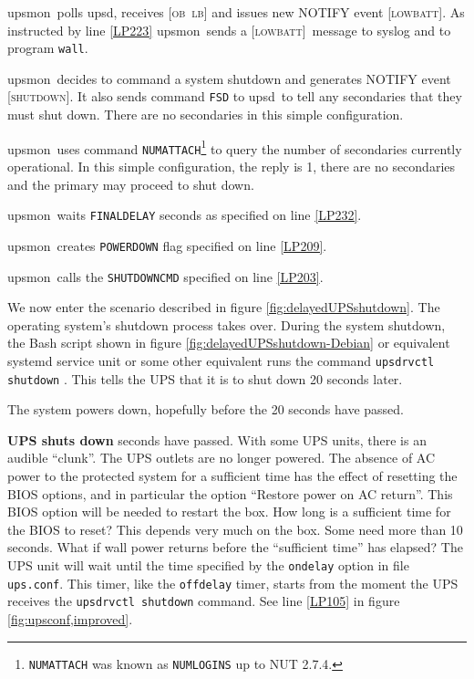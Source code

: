 \documentclass[12pt]{article}
\newcommand{\upsd}{\mbox{\textcolor{UPSDCOLOUR}{upsd}}}
\newcommand{\upsmon}{\mbox{\textcolor{MONCOLOUR}{upsmon}}}
\newcommand{\LB}{\textcolor{UPSDCOLOUR}{\textsc{lb}}}
\newcommand{\OB}{\textcolor{UPSDCOLOUR}{\textsc{ob}}}
\newcommand{\LOWBATT}{\textcolor{MONCOLOUR}{\textsc{lowbatt}}}
\newcommand{\SHUTDOWN}{\textcolor{MONCOLOUR}{\textsc{shutdown}}}
\newcommand{\status}[1]{\textcolor{UPSDCOLOUR}{[{#1}]}}
\newcommand{\NOTev}[1]{\textcolor{MONCOLOUR}{[{#1}]}}
\newcommand{\upsconf}{\textcolor{UPSDCOLOUR}{\texttt{ups.conf}}}
\newcommand{\li}{\item}                 %
\begin{document}
\li \upsmon\ polls \upsd, receives \status{\OB\ \LB} and issues new
NOTIFY event \NOTev{\LOWBATT}.  As instructed by line \ref{LP223}
\upsmon\ sends a \NOTev{\LOWBATT}\ message to syslog and to program
\texttt{wall}.

\li\label{serverLB} \upsmon\ decides to command a system shutdown and
generates NOTIFY event \NOTev{\SHUTDOWN}.  It also sends command
\texttt{FSD} to \upsd\ to tell any secondaries that they must shut down.
There are no secondaries in this simple configuration.

\li \upsmon\ uses command
\texttt{NUMATTACH}\footnote{\texttt{NUMATTACH} was known as
\texttt{NUMLOGINS} up to NUT 2.7.4.} to query the number of
secondaries currently operational.  In this simple configuration, the
reply is 1, there are no secondaries and the primary may proceed to
shut down.

\li \upsmon\ waits \texttt{FINALDELAY} seconds as specified on line \ref{LP232}.

\li \upsmon\ creates \texttt{POWERDOWN} flag specified on line \ref{LP209}.

\li \upsmon\ calls the \texttt{SHUTDOWNCMD} specified on line \ref{LP203}.

\li We now enter the scenario described in figure
\ref{fig:delayedUPSshutdown}.  The operating system's shutdown process takes
over.  During the system shutdown, the Bash script shown in figure
\ref{fig:delayedUPSshutdown-Debian} or equivalent systemd service unit or some
other equivalent runs the command \texttt{upsdrvctl shutdown} .  This tells
the UPS that it is to shut down 20 seconds later.

\li The system powers down, hopefully before the 20 seconds have passed.

\li \textbf{UPS shuts down}  seconds have passed.  With some UPS
units, there is an audible ``clunk''.  The UPS outlets are no longer powered.
The absence of AC power to the protected system for a sufficient time has the
effect of resetting the BIOS options, and in particular the option ``Restore
power on AC return''.  This BIOS option will be needed to restart the box.
How long is a sufficient time for the BIOS to reset?  This depends very much
on the box.  Some need more than 10 seconds.  What if wall power returns
before the ``sufficient time'' has elapsed?  The UPS unit will wait until the
time specified by the \texttt{ondelay} option in file \upsconf.  This timer,
like the \texttt{offdelay} timer, starts from the moment the UPS receives the
\texttt{upsdrvctl shutdown} command.  See line \ref{LP105} in figure
\ref{fig:upsconf,improved}.
\end{document}
